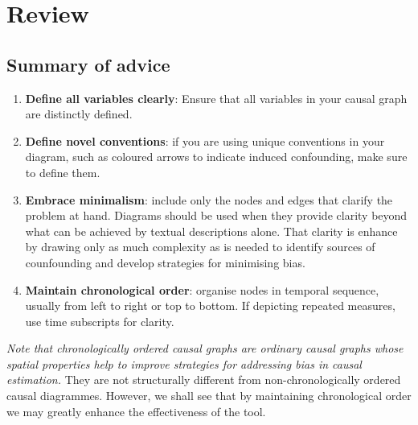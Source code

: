 \documentclass[
  singlecolumn]{report}
\begin{document}
\hypertarget{review}{%
\section{Review}\label{review}}

\hypertarget{summary-of-advice}{%
\subsection{Summary of advice}\label{summary-of-advice}}

\begin{enumerate}
\def\labelenumi{\arabic{enumi}.}
\item
  \textbf{Define all variables clearly}: Ensure that all variables in
  your causal graph are distinctly defined.
\item
  \textbf{Define novel conventions}: if you are using unique conventions
  in your diagram, such as coloured arrows to indicate induced
  confounding, make sure to define them.
\item
  \textbf{Embrace minimalism}: include only the nodes and edges that
  clarify the problem at hand. Diagrams should be used when they provide
  clarity beyond what can be achieved by textual descriptions alone.
  That clarity is enhance by drawing only as much complexity as is
  needed to identify sources of counfounding and develop strategies for
  minimising bias.
\item
  \textbf{Maintain chronological order}: organise nodes in temporal
  sequence, usually from left to right or top to bottom. If depicting
  repeated measures, use time subscripts for clarity.
\end{enumerate}

\emph{Note that chronologically ordered causal graphs are ordinary
causal graphs whose spatial properties help to improve strategies for
addressing bias in causal estimation.} They are not structurally
different from non-chronologically ordered causal diagrammes. However,
we shall see that by maintaining chronological order we may greatly
enhance the effectiveness of the tool.
\end{document}
